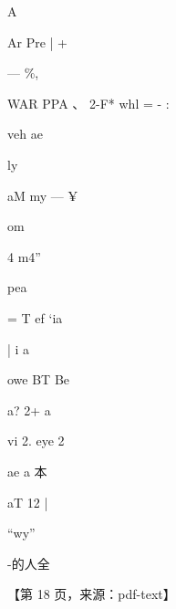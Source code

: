 \documentclass[UTF8,12pt,a4paper,openany]{ctexbook}
\begin{document}
\begin{enumerate}[label=\textbf{\arabic*.},leftmargin=2em]
A\par Ar   Pre |       +\par —   \%,\par WAR PPA 、  2-F* whl = - :\par veh      ae\par ly\par aM        my      —  ¥\par om\par 4      m4”\par pea\par = T ef ‘ia\par |                    i      a\par owe BT Be\par a? 2+ a\par vi     2. eye 2\par ae a    本\par aT    12                    |\par “wy”\par -的人全\par \par 【第 18 页，来源：pdf-text】

\end{enumerate}
\end{document}
